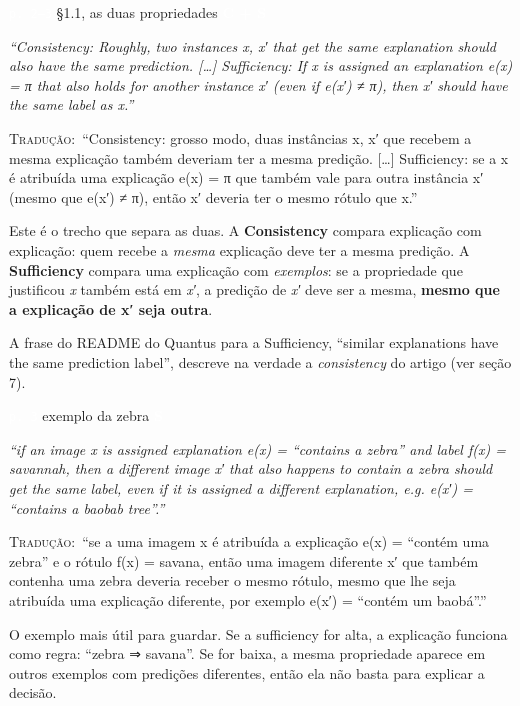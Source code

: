 \documentclass[11pt,a4paper]{article}
\newcommand{\metrictag}[2]{{\setlength{\fboxsep}{1.5pt}%
  \ifstrequal{#1}{c}{\colorbox{cC}{\textcolor{white}{\scriptsize\textbf{#2}}}}{%
  \ifstrequal{#1}{s}{\colorbox{cS}{\textcolor{white}{\scriptsize\textbf{#2}}}}{%
  \colorbox{black!60}{\textcolor{white}{\scriptsize\textbf{#2}}}}}}}
\newcommand{\pagechip}[1]{{\setlength{\fboxsep}{1.5pt}\colorbox{cAcc}{\textcolor{white}{\scriptsize\texttt{#1}}}}}
\newenvironment{origquote}{\par\itshape\small}{\par}
\newenvironment{tradquote}{\par\small\textsc{Tradução:}\ }{\par}
\newcommand{\explab}[1]{\par\smallskip{\small\color{cAcc}\textbf{\MakeUppercase{#1}}}\par}
\begin{document}
\begin{citacard}{\pagechip{p. 2–3} §1.1, as duas propriedades \metrictag{cs}{C + S}}
\begin{origquote}“Consistency: Roughly, two instances x, x′ that get the same explanation should also have the same prediction. […] Sufficiency: If x is assigned an explanation e(x) = π that also holds for another instance x′ (even if e(x′) ≠ π), then x′ should have the same label as x.”\end{origquote}
\begin{tradquote}“Consistency: grosso modo, duas instâncias x, x′ que recebem a mesma explicação também deveriam ter a mesma predição. […] Sufficiency: se a x é atribuída uma explicação e(x) = π que também vale para outra instância x′ (mesmo que e(x′) ≠ π), então x′ deveria ter o mesmo rótulo que x.”\end{tradquote}
\explab{Explicação}
Este é o trecho que separa as duas. A \textbf{Consistency} compara explicação com explicação: quem recebe a \textit{mesma} explicação deve ter a mesma predição. A \textbf{Sufficiency} compara uma explicação com \textit{exemplos}: se a propriedade que justificou \textit{x} também está em \textit{x′}, a predição de \textit{x′} deve ser a mesma, \textbf{mesmo que a explicação de x′ seja outra}.

A frase do README do Quantus para a Sufficiency, “similar explanations have the same prediction label”, descreve na verdade a \textit{consistency} do artigo (ver seção 7).
\end{citacard}

\begin{citacard}{\pagechip{p. 3} exemplo da zebra \metrictag{s}{S}}
\begin{origquote}“if an image x is assigned explanation e(x) = “contains a zebra” and label f(x) = savannah, then a different image x′ that also happens to contain a zebra should get the same label, even if it is assigned a different explanation, e.g. e(x′) = “contains a baobab tree”.”\end{origquote}
\begin{tradquote}“se a uma imagem x é atribuída a explicação e(x) = “contém uma zebra” e o rótulo f(x) = savana, então uma imagem diferente x′ que também contenha uma zebra deveria receber o mesmo rótulo, mesmo que lhe seja atribuída uma explicação diferente, por exemplo e(x′) = “contém um baobá”.”\end{tradquote}
\explab{Explicação}
O exemplo mais útil para guardar. Se a sufficiency for alta, a explicação funciona como regra: “zebra ⇒ savana”. Se for baixa, a mesma propriedade aparece em outros exemplos com predições diferentes, então ela não basta para explicar a decisão.
\end{citacard}
\end{document}
